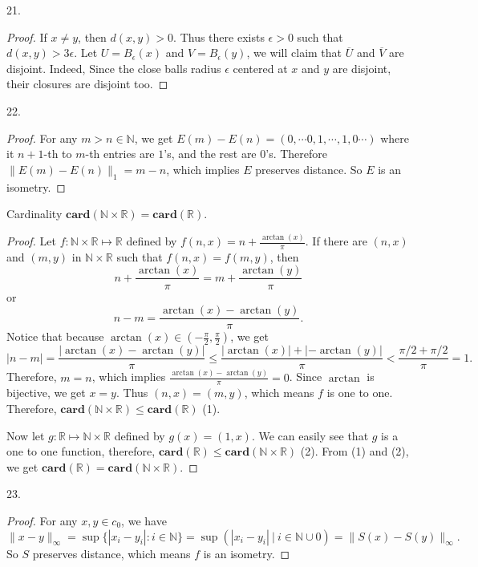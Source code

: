 \documentclass[12pt, a4paper]{article}
\theoremstyle{plain}
\newcommand{\N}{\mathbb{N}}
\newcommand{\R}{\mathbb{R}}
\newcommand{\card}{\mathbf{card}}
\begin{document}
21.
\begin{proof}
If $x\neq y$, then $d(x,y)>0$. Thus there exists $\epsilon>0$ such that $d(x,y)>3\epsilon$. Let $U=B_\epsilon(x)$ and $V=B_\epsilon(y)$, we will claim that $\overline{U}$ and $\overline{V}$ are disjoint. Indeed, Since the close balls radius $\epsilon$ centered at $x$ and $y$ are disjoint, their closures are disjoint too.
\end{proof}

22.
\begin{proof}
For any $m>n\in \N$, we get $E(m)-E(n)=(0,\cdots 0,1,\cdots,1,0\cdots)$ where it $n+1$-th to $m$-th entries are $1$'s, and the rest are $0$'s. Therefore $\|E(m)-E(n)\|_1=m-n$, which implies $E$ preserves distance. So $E$ is an isometry.
\end{proof}

\pagebreak

\begin{lemma}{Cardinality}
$\card(\N\times \R)=\card(\R)$.
\end{lemma}
\begin{proof}
Let $f:\N\times \R\mapsto\R$ defined by $f(n,x)=n+\frac{\arctan(x)}{\pi}$. If there are $(n,x)$ and $(m,y)$ in $\N\times \R$ such that $f(n,x)=f(m,y)$, then 
\[
n+\frac{\arctan(x)}{\pi}=m+\frac{\arctan(y)}{\pi}
\]
or 
\[
n-m=\frac{\arctan(x)-\arctan(y)}{\pi}.
\]
Notice that because $\arctan(x)\in (-\frac{\pi}{2},\frac{\pi}{2})$, we get
\[
|n-m|=\frac{|\arctan(x)-\arctan(y)|}{\pi}\leq \frac{|\arctan(x)|+|-\arctan(y)|}{\pi}<\frac{\pi/2+\pi/2}{\pi}=1.
\]
Therefore, $m=n$, which implies $\frac{\arctan(x)-\arctan(y)}{\pi}=0$. Since $\arctan$ is bijective, we get $x=y$. Thus $(n,x)=(m,y)$, which means $f$ is one to one. Therefore, $\card(\N\times\R)\leq \card(\R)$ (1).

Now let $g:\R\mapsto \N\times \R$ defined by $g(x)=(1,x)$. We can easily see that $g$ is a one to one function, therefore, $\card(\R)\leq \card(\N\times\R)$ (2). From (1) and (2), we get $\card(\R)=\card(\N\times\R)$.
\end{proof}

23.
\begin{proof}
For any $x,y\in c_0$, we have
\[
\|x-y\|_\infty=\sup\{|x_i-y_i|:i\in \N\}=\sup( {|x_i - y_i|~\vert~i\in \mathbb{N}}\cup{0})=\|S(x)-S(y)\|_\infty.
\]
So $S$ preserves distance, which means $f$ is an isometry.
\end{proof}
\end{document}
